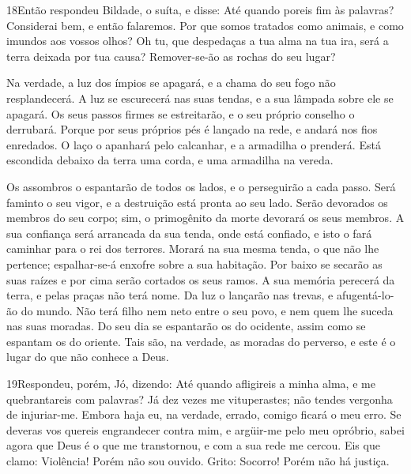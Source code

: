 \medskip

\lettrine{18} Então respondeu Bildade, o suíta, e disse:
Até quando poreis fim às palavras? Considerai bem, e então
falaremos. Por que somos tratados como animais, e como imundos
aos vossos olhos? Oh tu, que despedaças a tua alma na tua ira,
será a terra deixada por tua causa? Remover-se-ão as rochas do seu
lugar?

Na verdade, a luz dos ímpios se apagará, e a chama do seu fogo não
resplandecerá. A luz se escurecerá nas suas tendas, e a sua
lâmpada sobre ele se apagará. Os seus passos firmes se
estreitarão, e o seu próprio conselho o derrubará. Porque por
seus próprios pés é lançado na rede, e andará nos fios enredados.
O laço o apanhará pelo calcanhar, e a armadilha o prenderá.
Está escondida debaixo da terra uma corda, e uma armadilha na
vereda.

Os assombros o espantarão de todos os lados, e o perseguirão a
cada passo. Será faminto o seu vigor, e a destruição está
pronta ao seu lado. Serão devorados os membros do seu corpo;
sim, o primogênito da morte devorará os seus membros. A sua
confiança será arrancada da sua tenda, onde está confiado, e isto o
fará caminhar para o rei dos terrores. Morará na sua mesma
tenda, o que não lhe pertence; espalhar-se-á enxofre sobre a sua
habitação. Por baixo se secarão as suas raízes e por cima
serão cortados os seus ramos. A sua memória perecerá da
terra, e pelas praças não terá nome. Da luz o lançarão nas
trevas, e afugentá-lo-ão do mundo. Não terá filho nem neto
entre o seu povo, e nem quem lhe suceda nas suas moradas. Do
seu dia se espantarão os do ocidente, assim como se espantam os do
oriente. Tais são, na verdade, as moradas do perverso, e este
é o lugar do que não conhece a Deus.

\medskip

\lettrine{19} Respondeu, porém, Jó, dizendo: Até quando
afligireis a minha alma, e me quebrantareis com palavras? Já dez
vezes me vituperastes; não tendes vergonha de injuriar-me.
Embora haja eu, na verdade, errado, comigo ficará o meu erro.
Se deveras vos quereis engrandecer contra mim, e argüir-me pelo
meu opróbrio, sabei agora que Deus é o que me transtornou, e com
a sua rede me cercou. Eis que clamo: Violência! Porém não sou
ouvido. Grito: Socorro! Porém não há justiça.

